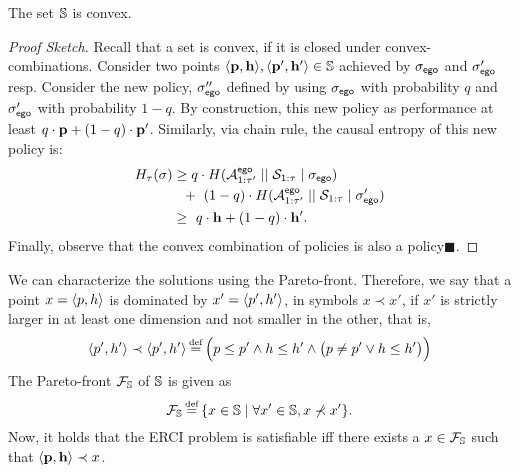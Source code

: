 \begin{example}
	
\end{example}

\begin{proposition}
  The set $\mathbb{S}$ is convex. 
\end{proposition}
\begin{proof}[Proof Sketch]
  Recall that a set is convex, if it is closed under
  convex-combinations\footnotemark. Consider two points
  $\langle \mathbf{p}, \mathbf{h} \rangle, \langle \mathbf{p}',
  \mathbf{h}' \rangle \in \mathbb{S}$ achieved by ${\sigma_{\mathsf{ego}}}$ and
  ${\sigma'_{\mathsf{ego}}}$ resp. Consider the new policy,
  ${\sigma''_{\mathsf{ego}}}$ defined by using ${\sigma_{\mathsf{ego}}}$ with
  probability $q$ and ${\sigma'_{\mathsf{ego}}}$ with probability $1 - q$.
  By construction, this new policy as performance at least $q\cdot \mathbf{p} + (1 - q)\cdot \mathbf{p}'$.
  Similarly, via chain rule, the causal entropy of this new policy is:
  \begin{equation}
    \begin{split}
      H_\tau(\sigma) &\geq q \cdot H( {\mathcal{A}}^{\mathsf{ego}}_{1:\tau'} \mid\mid {\mathcal{S}}_{1:\tau} \mid {\sigma_{\mathsf{ego}}}) \\
      &~~+ ~(1 - q)  \cdot H( {\mathcal{A}}^{\mathsf{ego}}_{1:\tau'} \mid\mid {\mathcal{S}}_{1:\tau} \mid {\sigma'_{\mathsf{ego}}})\\
      &\geq~q\cdot\mathbf{h} + (1 - q)\cdot \mathbf{h}'.
    \end{split}
  \end{equation}
  Finally, observe that the convex combination of policies is also a
  policy\hfill $\blacksquare$.
\end{proof}


We can characterize the solutions using the Pareto-front. Therefore, we say that a point $x = \langle p,h \rangle$ is dominated by $x' = \langle p', h' \rangle$, in symbols $x \prec x'$, if $x'$ is strictly larger in at least one dimension and not smaller in the other, that is, 
\begin{equation}
  \langle \scp', \rndp' \rangle 	 \prec \langle \scp', \rndp' \rangle \eqdef \Big( \scp \leq \scp' \land \rndp \leq \rndp' \land \big(\scp \neq \scp' \lor \rndp \leq \rndp'\big)	\Big)
\end{equation}
The Pareto-front $\mathcal{F}_{\mathbb{S}}$ of $\mathbb{S}$ is given as \[ \pareto{\solutions} \eqdef \{ x \in \solutions \mid \forall x' \in \solutions, x \not\prec x'  \}. \]
Now, it holds that the ERCI problem is satisfiable iff there exists a  $x \in \mathcal{F}_{\mathbb{S}}$ such that $\langle \mathbf{p}, \mathbf{h} \rangle \prec x$.  

